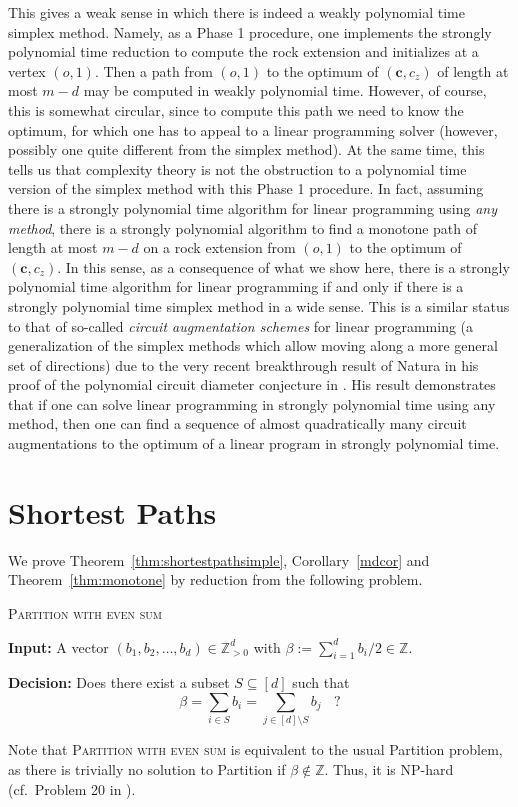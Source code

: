 \documentclass[centering,11pt,reqno]{amsart}
\theoremstyle{definition}
\newcommand{\NP}{\textsc{NP}}
\begin{document}
This gives a weak sense in which there is indeed a weakly polynomial time simplex method. Namely, as a Phase 1 procedure, one implements the strongly polynomial time reduction to compute the rock extension and initializes at a vertex $(o,1)$. Then a path from $(o,1)$ to the optimum of $(\mathbf{c}, c_{z})$ of length at most $m-d$ may be computed in weakly polynomial time. However, of course, this is somewhat circular, since to compute this path we need to know the optimum, for which one has to appeal to a linear programming solver (however, possibly one quite different from the simplex method). At the same time, this tells us that complexity theory is not the obstruction to a polynomial time version of the simplex method with this Phase 1 procedure. In fact, assuming there is a strongly polynomial time algorithm for linear programming using \emph{any method}, there is a strongly polynomial algorithm to find a monotone path of length at most $m-d$ on a rock extension from $(o,1)$ to the optimum of $(\mathbf{c}, c_{z})$. In this sense, as a consequence of what we show here, there is a strongly polynomial time algorithm for linear programming if and only if there is a strongly polynomial time simplex method in a wide sense. This is a similar status to that of so-called \emph{circuit augmentation schemes} for linear programming (a generalization of the simplex methods which allow moving along a more general set of directions) due to the very recent breakthrough result of Natura in his proof of the polynomial circuit diameter conjecture in \cite{StronglyPolyCircDiameter}. His result demonstrates that if one can solve linear programming in strongly polynomial time using any method, then one can find a sequence of almost quadratically many circuit augmentations to the optimum of a linear program in strongly polynomial time. 

\section{Shortest Paths}\label{sec:distance}
We prove Theorem~\ref{thm:shortestpathsimple}, Corollary~\ref{mdcor} and Theorem~\ref{thm:monotone} by reduction from the following problem.
\medskip

\begin{mdframed}[innerleftmargin=0.5em, innertopmargin=0.5em, innerrightmargin=0.5em, innerbottommargin=0.5em, userdefinedwidth=0.95\linewidth, align=center]
	{\textsc{Partition with even sum}}
	\sloppy

	\noindent
	\textbf{Input:} A vector $(b_{1}, b_{2},\dots, b_{d}) \in \mathbb{Z}^{d}_{>0}$ with $\beta:=\sum_{i=1}^d b_i/2 \in \mathbb{Z}$.
    
	\noindent
	\textbf{Decision:} Does there exist a subset $S \subseteq [d]$ such that
\[\beta = \sum_{i \in S} b_{i} = \sum_{j \in [d] \setminus S} b_{j} ~\,\,\,\, ? \]
\end{mdframed}
Note that \textsc{Partition with even sum} is equivalent to the usual Partition problem, as there is trivially no solution to Partition if $\beta \notin \mathbb{Z}$. Thus, it is \NP-hard (cf.~Problem 20 in \cite{KarpsList}).
\end{document}

